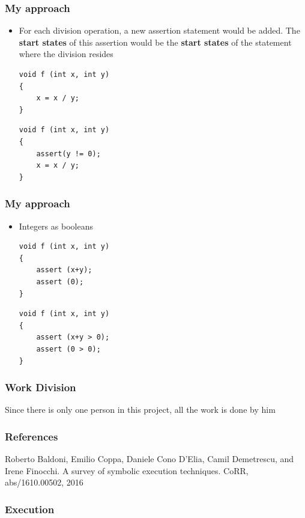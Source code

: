 \documentclass{beamer}
\begin{document}
\begin{frame}[fragile]
\frametitle{My approach}
\begin{itemize}

\item For each division operation, a new assertion statement would be added. The \textbf{start states} of this assertion would be the \textbf{start states} of the statement where the division resides

\begin{lstlisting}  
void f (int x, int y) 
{
	x = x / y;
}
\end{lstlisting}

\begin{lstlisting}  
void f (int x, int y) 
{
	assert(y != 0);
	x = x / y;
}
\end{lstlisting}

\end{itemize}
\end{frame}


\begin{frame}[fragile]
\frametitle{My approach}
\begin{itemize}

\item Integers as booleans

\begin{lstlisting}  
void f (int x, int y) 
{ 	
	assert (x+y);
	assert (0);
}
\end{lstlisting}

\begin{lstlisting}  
void f (int x, int y) 
{ 	
	assert (x+y > 0);
	assert (0 > 0);
}
\end{lstlisting}

\end{itemize}
\end{frame}



\begin{frame}[fragile]
\frametitle{Work Division}
Since there is only one person in this project, all the work is done by him
\end{frame}

\begin{frame}[fragile]
\frametitle{References}
Roberto Baldoni, Emilio Coppa, Daniele Cono D’Elia, Camil Demetrescu, and Irene Finocchi.
A survey of symbolic execution techniques. CoRR, abs/1610.00502, 2016
\end{frame}

\begin{frame}[fragile]
\frametitle{Execution}
\begin{block}{}
\end{block}
\end{frame}
\end{document}
